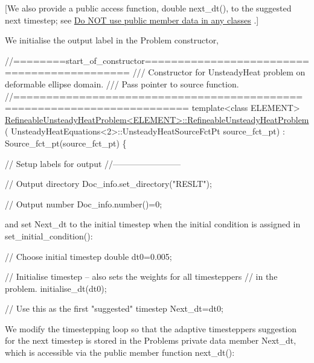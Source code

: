\mbox{[}We also provide a public access function, {\ttfamily double} {\ttfamily next\+\_\+dt()}, to the suggested next timestep; see \hyperlink{index_no_pub}{Do N\+OT use public member data in any classes} .\mbox{]}

We initialise the output label in the {\ttfamily Problem} constructor,

 
\begin{DoxyCodeInclude}
\textcolor{comment}{//========start\_of\_constructor============================================}
\textcolor{comment}{/// Constructor for UnsteadyHeat problem on deformable ellipse domain.}
\textcolor{comment}{}\textcolor{comment}{/// Pass pointer to source function.}
\textcolor{comment}{}\textcolor{comment}{//========================================================================}
\textcolor{keyword}{template}<\textcolor{keyword}{class} ELEMENT>
\hyperlink{classRefineableUnsteadyHeatProblem_a894f3bd6c1c23c307a736de6898e4e98}{RefineableUnsteadyHeatProblem<ELEMENT>::RefineableUnsteadyHeatProblem}
      (
 UnsteadyHeatEquations<2>::UnsteadyHeatSourceFctPt source\_fct\_pt)
 : Source\_fct\_pt(source\_fct\_pt)
\{
 
 \textcolor{comment}{// Setup labels for output}
 \textcolor{comment}{//------------------------}

 \textcolor{comment}{// Output directory}
 Doc\_info.set\_directory(\textcolor{stringliteral}{"RESLT"});
 
 \textcolor{comment}{// Output number}
 Doc\_info.number()=0; 

\end{DoxyCodeInclude}


and set {\ttfamily Next\+\_\+dt} to the initial timestep when the initial condition is assigned in {\ttfamily set\+\_\+initial\+\_\+condition()}\+:

 
\begin{DoxyCodeInclude}
   \textcolor{comment}{// Choose initial timestep}
   \textcolor{keywordtype}{double} dt0=0.005;

   \textcolor{comment}{// Initialise timestep -- also sets the weights for all timesteppers}
   \textcolor{comment}{// in the problem.}
   initialise\_dt(dt0);

   \textcolor{comment}{// Use this as the first "suggested" timestep}
   Next\_dt=dt0;

\end{DoxyCodeInclude}


We modify the timestepping loop so that the adaptive timestepper\textquotesingle{}s suggestion for the next timestep is stored in the {\ttfamily Problem\textquotesingle{}s} private data member {\ttfamily Next\+\_\+dt}, which is accessible via the public member function {\ttfamily next\+\_\+dt()}\+:

